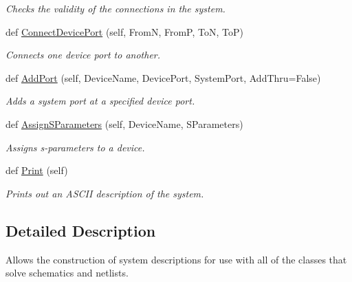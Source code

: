 \begin{DoxyCompactItemize}
\begin{DoxyCompactList}\small\item\em Checks the validity of the connections in the system. \end{DoxyCompactList}\item 
def \hyperlink{classSignalIntegrity_1_1SystemDescriptions_1_1SystemDescription_1_1SystemDescription_ae236b6d7df408d3cd15ca3727c4daa81}{Connect\+Device\+Port} (self, FromN, FromP, ToN, ToP)
\begin{DoxyCompactList}\small\item\em Connects one device port to another. \end{DoxyCompactList}\item 
def \hyperlink{classSignalIntegrity_1_1SystemDescriptions_1_1SystemDescription_1_1SystemDescription_ab60d596fbc393fd58c3fafa9566c7ac7}{Add\+Port} (self, Device\+Name, Device\+Port, System\+Port, Add\+Thru=False)
\begin{DoxyCompactList}\small\item\em Adds a system port at a specified device port. \end{DoxyCompactList}\item 
def \hyperlink{classSignalIntegrity_1_1SystemDescriptions_1_1SystemDescription_1_1SystemDescription_a5b5faca00f07328bfc8e2fcf76347f06}{Assign\+S\+Parameters} (self, Device\+Name, S\+Parameters)
\begin{DoxyCompactList}\small\item\em Assigns s-\/parameters to a device. \end{DoxyCompactList}\item 
\mbox{\label{classSignalIntegrity_1_1SystemDescriptions_1_1SystemDescription_1_1SystemDescription_a0203fc9c617eec80ba28741251ee3b86}} 
def \hyperlink{classSignalIntegrity_1_1SystemDescriptions_1_1SystemDescription_1_1SystemDescription_a0203fc9c617eec80ba28741251ee3b86}{Print} (self)
\begin{DoxyCompactList}\small\item\em Prints out an A\+S\+C\+II description of the system. \end{DoxyCompactList}\end{DoxyCompactItemize}


\subsection{Detailed Description}
Allows the construction of system descriptions for use with all of the classes that solve schematics and netlists. 

